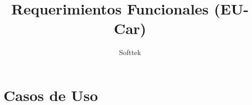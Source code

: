 \documentclass[10pt, letterpaper]{book}
\begin{document}
\title{Requerimientos Funcionales (EU-Car)}
\author{Softtek}
\date{}
\maketitle

\pagestyle{plain}
\tableofcontents

\chapter{Casos de Uso}

\end{document}
